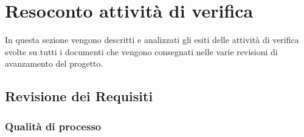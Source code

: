 \section{Resoconto attività di verifica}
In questa sezione vengono descritti e analizzati gli esiti delle attività
di verifica svolte su tutti i documenti che vengono consegnati nelle varie 
revisioni di avanzamento del progetto.

\subsection{Revisione dei Requisiti}


\subsubsection{Qualità di processo}

